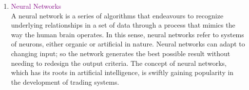 \begin{enumerate}
    \item 
    \textcolor{purple}{Neural Networks}
    \\
    A neural network is a series of algorithms that endeavours to recognize
    underlying relationships in a set of data through a process that mimics the way
    the human brain operates. In this sense, neural networks refer to systems of
    neurons, either organic or artificial in nature. Neural networks can adapt to
    changing input; so the network generates the best possible result without
    needing to redesign the output criteria. The concept of neural networks, which
    has its roots in artificial intelligence, is swiftly gaining popularity in the
    development of trading systems.
\end{enumerate}